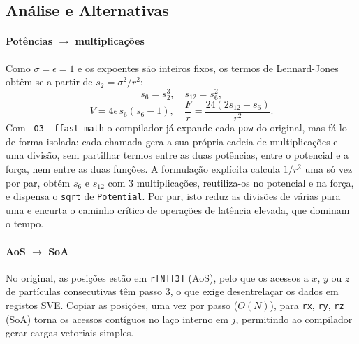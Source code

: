\documentclass[conference]{IEEEtran}
\begin{document}
\subsection{Análise e Alternativas}\label{AA}

\paragraph{Potências $\to$ multiplicações}
Como $\sigma=\epsilon=1$ e os expoentes são inteiros fixos, os termos de Lennard-Jones obtêm-se a partir de $s_2=\sigma^2/r^2$:
\begin{equation}
s_6 = s_2^3,\quad s_{12}=s_6^2,
\end{equation}
\begin{equation}
V = 4\epsilon\, s_6(s_6-1),\quad \frac{F}{r}=\frac{24(2s_{12}-s_6)}{r^2}.
\end{equation}
Com \texttt{-O3 -ffast-math} o compilador já expande cada \texttt{pow} do original, mas fá-lo de forma isolada: cada chamada gera a sua própria cadeia de multiplicações e uma divisão, sem partilhar termos entre as duas potências, entre o potencial e a força, nem entre as duas funções. A formulação explícita calcula $1/r^2$ uma só vez por par, obtém $s_6$ e $s_{12}$ com 3 multiplicações, reutiliza-os no potencial e na força, e dispensa o \texttt{sqrt} de \texttt{Potential}. Por par, isto reduz as divisões de várias para uma e encurta o caminho crítico de operações de latência elevada, que dominam o tempo.

\paragraph{AoS $\to$ SoA}
No original, as posições estão em \texttt{r[N][3]} (AoS), pelo que os acessos a $x$, $y$ ou $z$ de partículas consecutivas têm passo 3, o que exige desentrelaçar os dados em registos SVE. Copiar as posições, uma vez por passo ($O(N)$), para \texttt{rx}, \texttt{ry}, \texttt{rz} (SoA) torna os acessos contíguos no laço interno em $j$, permitindo ao compilador gerar cargas vetoriais simples.
\end{document}
